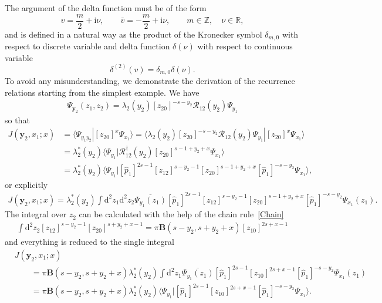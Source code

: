 \documentclass[10pt,a4paper]{amsart}
\renewcommand{\imath}{\mathrm{i}}
\numberwithin{equation}{section}
\begin{document}
The argument of the delta function  must be of the form
\begin{equation*}
	v = \frac{m}{2}+\imath\nu , \qquad \bar{v} = -\frac{m}{2}+\imath\nu ,
	\qquad m\in\mathbb{Z}, \quad \nu\in\mathbb{R} ,
\end{equation*}
and  is defined in a natural way as the product of the Kronecker symbol
$\delta_{m,0}$ with respect to discrete variable and delta function
$\delta(\nu)$ with respect to continuous variable
\begin{equation} \label{delta_sum}
	\delta^{(2)}(v) = \delta_{m,0} \delta(\nu) .
\end{equation}
To avoid any misunderstanding, we demonstrate the derivation of the recurrence
relations starting from the simplest example. We have
\begin{align*}
\Psi_{\bm{y}_2}(z_1,z_2) =
\lambda_2(y_2) [z_{20}]^{-s-y_2} \mathcal{R}_{12}(y_2) \Psi_{y_1}
\end{align*}
so that
\begin{align*}
J(\bm{y}_2,x_{1};x) & =
\langle \Psi_{y_1 y_2}|[z_{20}]^{x} \Psi_{x_{1}} \rangle =
\langle \lambda_2(y_2) [z_{20}]^{-s-y_2} \mathcal{R}_{12}(y_2) \Psi_{y_1}|[z_{20}]^{x} \Psi_{x_{1}} \rangle \\
& =
\lambda_2^\ast(y_2) \bigl\langle \Psi_{y_1}|
\mathcal{R}^{\dagger}_{12}(y_2) [z_{20}]^{s-1+y_2+x} \Psi_{x_{1}} \bigr\rangle \\
& =
\lambda_2^\ast(y_2)
\bigl\langle \Psi_{y_1}|
[\hat{p}_1]^{2s-1} [z_{12}]^{s-y_2-1} [z_{20}]^{s-1+y_2+x}
[\hat{p}_1]^{-s-y_2}
\Psi_{x_{1}} \bigr\rangle ,
\end{align*}
or explicitly
\begin{gather*}
J(\bm{y}_2,x_{1};x)
=
\lambda_2^\ast(y_2)
\int
\mathrm{d}^{2} z_1
\mathrm{d}^{2} z_2
\overline{\Psi_{y_1}(z_1)}
[\hat{p}_1]^{2s-1} [z_{12}]^{s-y_2-1} [z_{20}]^{s-1+y_2+x}
[\hat{p}_1]^{-s-y_2}
\Psi_{x_{1}}(z_1) .
\end{gather*}
The integral over $z_2$ can be calculated with the help of the
chain rule~\eqref{Chain}
\begin{align*}
\int \mathrm{d}^2 z_2 [z_{12}]^{s-y_2-1} [z_{20}]^{s+y_2+x-1} =
\pi \mathbf{B}(s-y_2,s+y_2+x) [z_{10}]^{2s+x-1}
\end{align*}
and everything is reduced to the single integral
\begin{align*}
&
J(\bm{y}_2,x_{1};x) \\
&\qquad =
\pi \mathbf{B}(s-y_2,s+y_2+x) \lambda_2^\ast(y_2)
\int
\mathrm{d}^{2} z_1
\overline{\Psi_{y_1}(z_1)}
[\hat{p}_1]^{2s-1} [z_{10}]^{2s+x-1}
[\hat{p}_1]^{-s-y_2}
\Psi_{x_{1}}(z_1) \\
&\qquad =
\pi \mathbf{B}(s-y_2,s+y_2+x) \lambda_2^\ast(y_2)
\bigl\langle \Psi_{y_1}|[\hat{p}_1]^{2s-1} [z_{10}]^{2s+x-1}
[\hat{p}_1]^{-s-y_2}
\Psi_{x_{1}}\bigr\rangle .
\end{align*}
\end{document}

